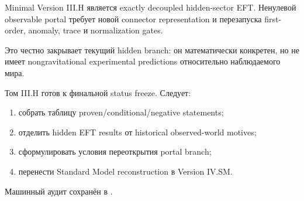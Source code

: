 \begin{theorem}
Minimal Version III.H является exactly decoupled hidden-sector EFT.
Ненулевой observable portal требует новой connector representation и
перезапуска first-order, anomaly, trace и normalization gates.
\end{theorem}

Это честно закрывает текущий hidden branch: он математически конкретен, но
не имеет nongravitational experimental predictions относительно
наблюдаемого мира.

\begin{protocol}
Том III.H готов к финальной status freeze. Следует:
\begin{enumerate}
 \item собрать таблицу proven/conditional/negative statements;
 \item отделить hidden EFT results от historical observed-world motives;
 \item сформулировать условия переоткрытия portal branch;
 \item перенести Standard Model reconstruction в Version IV.SM.
\end{enumerate}
\end{protocol}

Машинный аудит сохранён в
.
